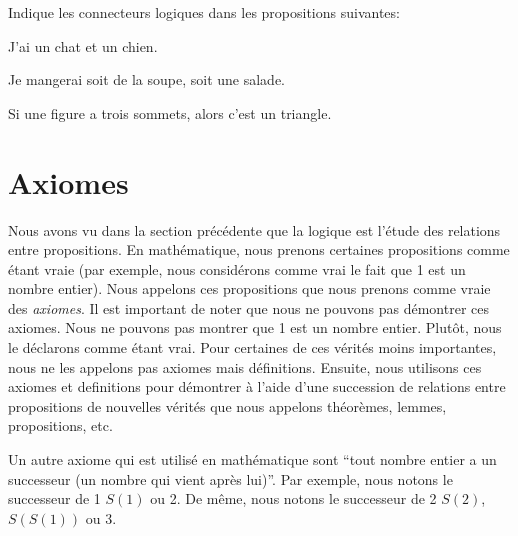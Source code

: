 \begin{exercice}
    Indique les connecteurs logiques dans les propositions suivantes:
    \begin{exerciceenumnoeq}
        \item J'ai un chat et un chien.
        \item Je mangerai soit de la soupe, soit une salade.
        \item Si une figure a trois sommets, alors c'est un triangle.
    \end{exerciceenumnoeq}
\end{exercice}

\section{Axiomes}

Nous avons vu dans la section précédente que la logique est l'étude des relations entre propositions. En mathématique, nous prenons certaines propositions comme étant vraie (par exemple, nous considérons comme vrai le fait que 1 est un nombre entier). Nous appelons ces propositions que nous prenons comme vraie des {\em axiomes}. Il est important de noter que nous ne pouvons pas démontrer ces axiomes. Nous ne pouvons pas montrer que 1 est un nombre entier. Plutôt, nous le déclarons comme étant vrai. Pour certaines de ces vérités moins importantes, nous ne les appelons pas axiomes mais définitions. Ensuite, nous utilisons ces axiomes et definitions pour démontrer à l'aide d'une succession de relations entre propositions de nouvelles vérités que nous appelons théorèmes, lemmes, propositions, etc.

\begin{exemple}\label{concepts_de_base:axiomes_ex}
    Un autre axiome qui est utilisé en mathématique sont ``tout nombre entier a un successeur (un nombre qui vient après lui)''. Par exemple, nous notons le successeur de 1 $S(1)$ ou 2. De même, nous notons le successeur de 2 $S(2)$, $S(S(1))$ ou 3.
\end{exemple}



